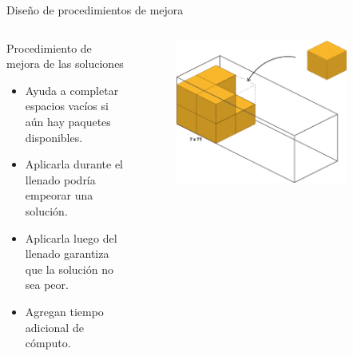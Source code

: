 \documentclass[handout]{beamer}
\begin{document}
\begin{frame}{Diseño de procedimientos de mejora}
    \begin{columns}
        \begin{column}{0.6\textwidth}
            \begin{exampleblock}{Procedimiento de mejora de las soluciones}
                \begin{itemize}[<+-| alert@+>]
                    \item Ayuda a completar espacios vacíos si aún hay paquetes disponibles.
                    \item Aplicarla durante el llenado podría empeorar una solución.
                    \item Aplicarla luego del llenado garantiza que la solución no sea peor.
                    \item Agregan tiempo adicional de cómputo.
                \end{itemize}
            \end{exampleblock}
        \end{column}
        \begin{column}{0.4\textwidth}
            \begin{figure}
                \centering
                \includegraphics[width=0.85\textwidth]{pic/llenado_adicional_durante.png}
            \end{figure}
            \begin{figure}
                \centering

\end{figure}
\end{column}
\end{columns}
\end{frame}
\end{document}
